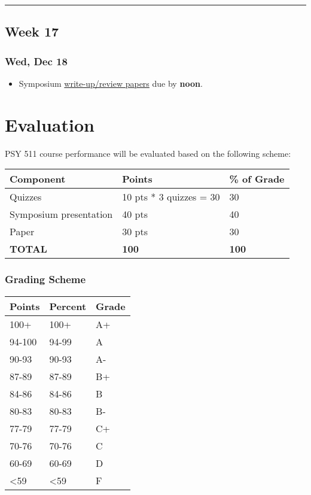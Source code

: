\documentclass[]{article}
\providecommand{\tightlist}{%
  \setlength{\itemsep}{0pt}\setlength{\parskip}{0pt}}
\begin{document}
\begin{center}\rule{0.5\linewidth}{\linethickness}\end{center}

\hypertarget{week-17}{%
\subsection{Week 17}\label{week-17}}

\hypertarget{wed-dec-18}{%
\subsubsection{Wed, Dec 18}\label{wed-dec-18}}

\begin{itemize}
\tightlist
\item
  Symposium \href{evaluation.html}{write-up/review papers} due by
  \textbf{noon}.
\end{itemize}

\hypertarget{evaluation}{%
\section{Evaluation}\label{evaluation}}

PSY 511 course performance will be evaluated based on the following
scheme:

\begin{longtable}[]{@{}lll@{}}
\toprule
Component & Points & \% of Grade\tabularnewline
\midrule
\endhead
Quizzes & 10 pts * 3 quizzes = 30 & 30\tabularnewline
Symposium presentation & 40 pts & 40\tabularnewline
Paper & 30 pts & 30\tabularnewline
\textbf{TOTAL} & \textbf{100} & \textbf{100}\tabularnewline
\bottomrule
\end{longtable}

\hypertarget{grading-scheme}{%
\subsubsection{Grading Scheme}\label{grading-scheme}}

\begin{longtable}[]{@{}lll@{}}
\toprule
Points & Percent & Grade\tabularnewline
\midrule
\endhead
100+ & 100+ & A+\tabularnewline
94-100 & 94-99 & A\tabularnewline
90-93 & 90-93 & A-\tabularnewline
87-89 & 87-89 & B+\tabularnewline
84-86 & 84-86 & B\tabularnewline
80-83 & 80-83 & B-\tabularnewline
77-79 & 77-79 & C+\tabularnewline
70-76 & 70-76 & C\tabularnewline
60-69 & 60-69 & D\tabularnewline
\textless{}59 & \textless{}59 & F\tabularnewline
\bottomrule
\end{longtable}
\end{document}

